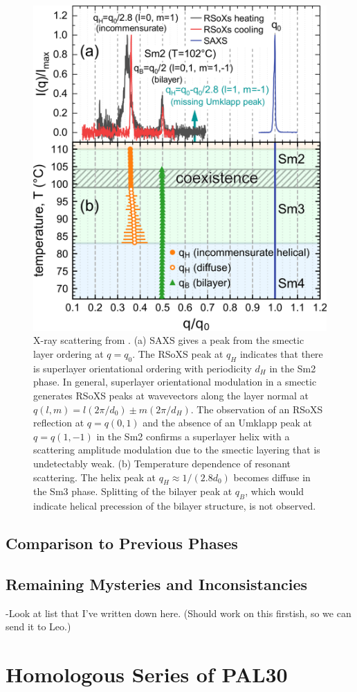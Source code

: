 \begin{figure}[h!]
    \centering
    \includegraphics[width=.8\textwidth]{./figs/pal30/finalFigs/xray-combined.png}
    \caption{\label{fig:xray-combined} X-ray scattering from .
        (a) SAXS gives a peak from the smectic layer ordering at $q=q_0$.
        The RSoXS peak at $q_H$ indicates that there is superlayer orientational ordering with periodicity $d_H$
        in the Sm2 phase.
        In general, superlayer orientational modulation in a smectic generates RSoXS peaks at wavevectors along the layer normal at
        $q(l,m) = l(2\pi/d_0) \pm m(2\pi/d_H)$\cite{levelut1999tensorial}.  The
        observation of an RSoXS reflection at $q = q(0,1)$ and the absence of an Umklapp peak at $q = q(1,-1)$  in
        the Sm2 confirms a superlayer helix with a scattering amplitude
        modulation due to the smectic layering that is undetectably weak.
        (b) Temperature dependence of resonant scattering. The helix peak at $q_H \approx1/(2.8 d_0)$ becomes diffuse in the Sm3 phase. Splitting
        of the bilayer peak at $q_B$, which would indicate helical precession of the bilayer structure, is not observed.
        }
    \end{figure}

\subsection{Comparison to Previous Phases}
\subsection{Remaining Mysteries and Inconsistancies}
-Look at list that I've written down here. (Should work on this firstish, so we
can send it to Leo.)
\section{Homologous Series of PAL30}


